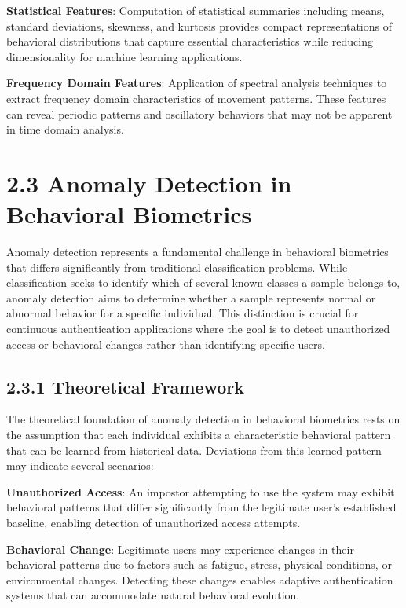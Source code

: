 \documentclass[
  12pt,
  a4paper,
]{report}
\begin{document}
\textbf{Statistical Features}: Computation of statistical summaries
including means, standard deviations, skewness, and kurtosis provides
compact representations of behavioral distributions that capture
essential characteristics while reducing dimensionality for machine
learning applications.

\textbf{Frequency Domain Features}: Application of spectral analysis
techniques to extract frequency domain characteristics of movement
patterns. These features can reveal periodic patterns and oscillatory
behaviors that may not be apparent in time domain analysis.

\section{2.3 Anomaly Detection in Behavioral
Biometrics}\label{anomaly-detection-in-behavioral-biometrics}

Anomaly detection represents a fundamental challenge in behavioral
biometrics that differs significantly from traditional classification
problems. While classification seeks to identify which of several known
classes a sample belongs to, anomaly detection aims to determine whether
a sample represents normal or abnormal behavior for a specific
individual. This distinction is crucial for continuous authentication
applications where the goal is to detect unauthorized access or
behavioral changes rather than identifying specific users.

\subsection{2.3.1 Theoretical Framework}\label{theoretical-framework}

The theoretical foundation of anomaly detection in behavioral biometrics
rests on the assumption that each individual exhibits a characteristic
behavioral pattern that can be learned from historical data. Deviations
from this learned pattern may indicate several scenarios:

\textbf{Unauthorized Access}: An impostor attempting to use the system
may exhibit behavioral patterns that differ significantly from the
legitimate user's established baseline, enabling detection of
unauthorized access attempts.

\textbf{Behavioral Change}: Legitimate users may experience changes in
their behavioral patterns due to factors such as fatigue, stress,
physical conditions, or environmental changes. Detecting these changes
enables adaptive authentication systems that can accommodate natural
behavioral evolution.
\end{document}
